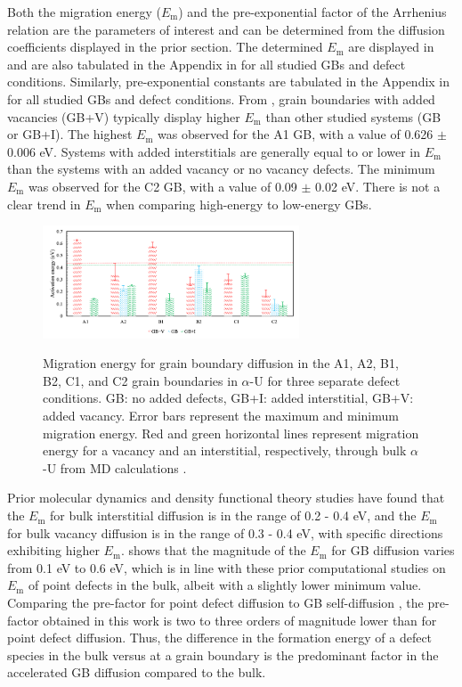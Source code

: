 \documentclass[review]{elsarticle}
\begin{document}
Both the migration energy ($E_{\mathrm{m}}$) and the pre-exponential factor of the Arrhenius relation are the parameters of interest and can be determined from the diffusion coefficients displayed in the prior section. The determined $E_{\mathrm{m}}$ are displayed in  and are also tabulated in the Appendix in  for all studied GBs and defect conditions. Similarly, pre-exponential constants are tabulated in the Appendix in  for all studied GBs and defect conditions. From , grain boundaries with added vacancies (GB+V) typically display higher $E_{\mathrm{m}}$ than other studied systems (GB or GB+I). The highest $E_{\mathrm{m}}$ was observed for the A1 GB, with a value of 0.626 $\pm$ 0.006 eV. Systems with added interstitials are generally equal to or lower in $E_{\mathrm{m}}$ than the systems with an added vacancy or no vacancy defects. The minimum $E_{\mathrm{m}}$ was observed for the C2 GB, with a value of 0.09 $\pm$ 0.02 eV. There is not a clear trend in $E_{\mathrm{m}}$ when comparing high-energy to low-energy GBs. 

\begin{figure}[h!]
\centering
\includegraphics[width = 3in]{12_migration.png}\
\caption{Migration energy for grain boundary diffusion in the A1, A2, B1, B2, C1, and C2 grain boundaries in $\alpha$-U for three separate defect conditions. GB: no added defects, GB+I: added interstitial, GB+V: added vacancy. Error bars represent the maximum and minimum migration energy. Red and green horizontal lines represent migration energy for a vacancy and an interstitial, respectively, through bulk $\alpha$-U from MD calculations \cite{WANG2023154289}.}
\label{fig:Migra}
\end{figure}

Prior molecular dynamics \cite{WANG2023154289} and density functional theory \cite{wirth2011} studies have found that the $E_{\mathrm{m}}$ for bulk interstitial diffusion is in the range of 0.2 - 0.4 eV, and the $E_{\mathrm{m}}$ for bulk vacancy diffusion is in the range of 0.3 - 0.4 eV, with specific directions exhibiting higher $E_{\mathrm{m}}$.  shows that the magnitude of the $E_{\mathrm{m}}$ for GB diffusion varies from 0.1 eV to 0.6 eV, which is in line with these prior computational studies on $E_{\mathrm{m}}$ of point defects in the bulk, albeit with a slightly lower minimum value. Comparing the pre-factor for point defect diffusion to GB self-diffusion \cite{WANG2023154289}, the pre-factor obtained in this work is two to three orders of magnitude lower than for point defect diffusion. Thus, the difference in the formation energy of a defect species in the bulk versus at a grain boundary is the predominant factor in the accelerated GB diffusion compared to the bulk.
\end{document}
